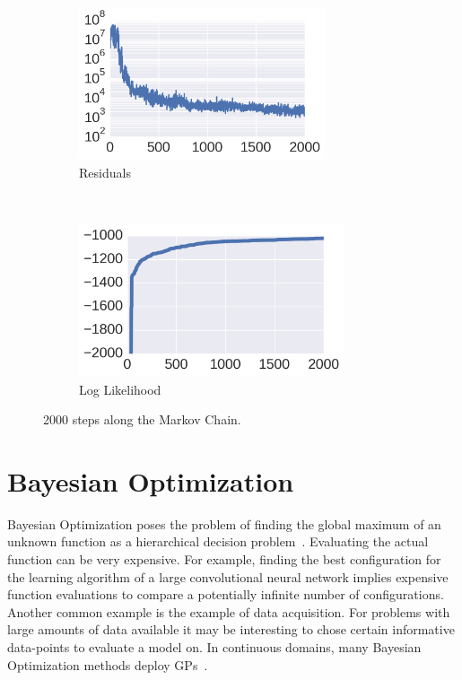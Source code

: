 \documentclass{article} %
\begin{document}
\begin{figure}
        \centering
        \begin{subfigure}[b]{0.5\textwidth} \centering
                \includegraphics[height=4.5cm]{figs/structureAirline_res_c.png}
                \caption{Residuals}
                \label{fig:res}
        \end{subfigure}%
        ~ %
        \begin{subfigure}[b]{0.5\textwidth} \centering
                \includegraphics[height=4.5cm]{figs/structureAirline_log_c.png}
                \caption{Log Likelihood}
                \label{fig:log))}
        \end{subfigure}
        \caption{2000 steps along the Markov Chain.}\label{fig:reslog}
\end{figure}


\section{Bayesian Optimization}\label{sec:bayesopt}
Bayesian Optimization poses the problem of finding the global maximum of an unknown function as a hierarchical decision problem~\citep{ghahramani2015probabilistic}. Evaluating the actual function can be very expensive. For example, finding the best configuration for the learning algorithm of a large convolutional neural network implies expensive function evaluations to compare a potentially infinite number of configurations. Another common example is the example of data acquisition. For problems with large amounts of data available it may be interesting to chose certain informative data-points to evaluate a model on. In continuous domains, many Bayesian Optimization methods deploy GPs~\citep[e.g.][]{snoek2012practical}.
\end{document}
